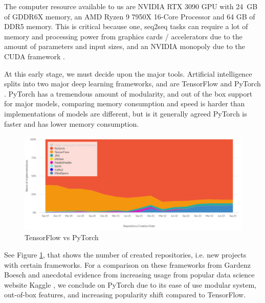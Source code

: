 \documentclass[preprint,11pt,review,authoryear]{elsarticle}
\begin{document}
The computer resource available to us are NVIDIA RTX 3090 GPU with 24 GB of GDDR6X memory, an AMD Ryzen 9 7950X 16-Core Processor and 64 GB of DDR5 memory. This is critical because one, seq2seq tasks can require a lot of memory and processing power from graphics cards / accelerators due to the amount of parameters and input sizes, and an NVIDIA monopoly due to the CUDA framework \citep{CUDAToolkitFree}.

At this early stage, we must decide upon the major tools. Artificial intelligence splits into two major deep learning frameworks, and are TensorFlow \citep{abadiTensorFlowSystemLargescale2016} and PyTorch \citep{paszkePyTorchImperativeStyle2019}. PyTorch has a tremendous amount of modularity, and out of the box support for major models, comparing memory consumption and speed is harder than implementations of models are different, but is it generally agreed PyTorch is faster and has lower memory consumption.

\begin{figure}[h]
    \centering
    \includegraphics[width=1\textwidth]{images/pytorch-vs-tensorflow-popularity-comparison.png}
    \caption{TensorFlow vs PyTorch \citep{boeschPytorchVsTensorflow2023}}
    \label{fig:tfvspt}
\end{figure}

See Figure \ref{fig:tfvspt}, that shows the number of created repositories, i.e. new projects with certain frameworks. For a comparison on these frameworks from Gardenz Boesch \citep{boeschPytorchVsTensorflow2023} and anecdotal evidence from increasing usage from popular data science website Kaggle \citep{anthonygoldbloomKaggleYourHome}, we conclude on PyTorch due to its ease of use modular system, out-of-box features, and increasing popularity shift compared to TensorFlow.
\end{document}
